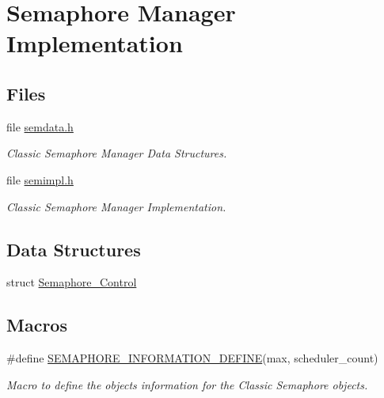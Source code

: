 \hypertarget{group__ClassicSemImpl}{}\section{Semaphore Manager Implementation}
\label{group__ClassicSemImpl}
\subsection*{Files}
\begin{DoxyCompactItemize}
\item 
file \mbox{\hyperlink{semdata_8h}{semdata.\+h}}
\begin{DoxyCompactList}\small\item\em Classic Semaphore Manager Data Structures. \end{DoxyCompactList}\item 
file \mbox{\hyperlink{semimpl_8h}{semimpl.\+h}}
\begin{DoxyCompactList}\small\item\em Classic Semaphore Manager Implementation. \end{DoxyCompactList}\end{DoxyCompactItemize}
\subsection*{Data Structures}
\begin{DoxyCompactItemize}
\item 
struct \mbox{\hyperlink{structSemaphore__Control}{Semaphore\+\_\+\+Control}}
\end{DoxyCompactItemize}
\subsection*{Macros}
\begin{DoxyCompactItemize}
\item 
\#define \mbox{\hyperlink{group__ClassicSemImpl_ga01b5e9375074423a86334974811e4028}{S\+E\+M\+A\+P\+H\+O\+R\+E\+\_\+\+I\+N\+F\+O\+R\+M\+A\+T\+I\+O\+N\+\_\+\+D\+E\+F\+I\+NE}}(max,  scheduler\+\_\+count)
\begin{DoxyCompactList}\small\item\em Macro to define the objects information for the Classic Semaphore objects. \end{DoxyCompactList}\end{DoxyCompactItemize}
